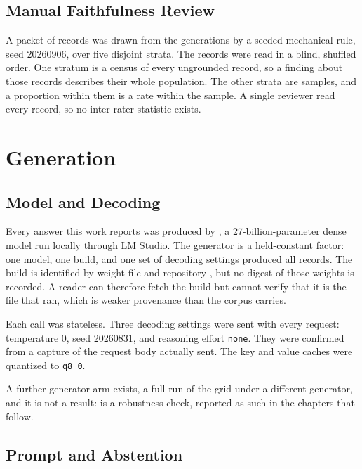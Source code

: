 \subsection{Manual Faithfulness Review}

A packet of \thesisNumReviewItems{} records was drawn from the
\thesisNumGenerations{} generations by a seeded mechanical rule, seed 20260906,
over five disjoint strata. The records were read in a blind, shuffled order. One
stratum is a census of every ungrounded record, so a finding about those records
describes their whole population. The other strata are samples, and a
proportion within them is a rate within the sample. A single reviewer read every
record, so no inter-rater statistic exists.

\section{Generation}

\subsection{Model and Decoding}

Every answer this work reports was produced by \thesisQeightModel{} \parencite{qwen3.8-27b}, a
27-billion-parameter dense model run locally through LM Studio. The generator is
a held-constant factor: one model, one build, and one set of decoding settings
produced all \thesisQeightNumRecords{} records. The build is identified by
weight file and repository \parencite{unsloth-qwen3.8-27b-gguf}, but no digest
of those weights is recorded. A reader can therefore fetch the build but cannot
verify that it is the file that ran, which is weaker provenance than the corpus
carries.

Each call was stateless. Three decoding settings were sent with every request:
temperature 0, seed 20260831, and reasoning effort \texttt{none}. They were
confirmed from a capture of the request body actually sent. The key and value caches were quantized to \texttt{q8\_0}.

A further generator arm exists, a full run of the grid under a different
generator, and it is not a result: \thesisFlashRobustnessModel{}
\parencite{qwen3.8-flash-next} is a robustness check, reported as such in the
chapters that follow.

\subsection{Prompt and Abstention}

